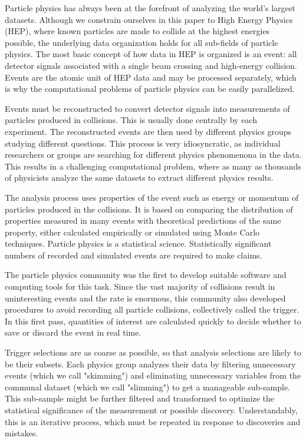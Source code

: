 \documentclass[a4paper]{jpconf}
\begin{document}
Particle physics has always been at the forefront of analyzing the world's largest datasets. Although we constrain ourselves in this paper to High Energy Physics (HEP), where known particles are made to collide at the highest energies possible, the underlying data organization holds for all sub-fields of particle physics. The most basic concept of how data in HEP is organized is an event: all detector signals associated with a single beam crossing and high-energy collision. Events are the atomic unit of HEP data and may be processed separately, which is why the computational problems of particle physics can be easily parallelized. 

Events must be reconstructed to convert detector signals into measurements of particles produced in collisions. This is usually done centrally by each experiment. The reconstructed events are then used by different physics groups studying different questions. This process is very idiosyncratic, as individual researchers or groups are searching for different physics phenomenona in the data. This results in a challenging computational problem, where as many as thousands of physicists analyze the same datasets to extract different physics results.

The analysis process uses properties of the event such as energy or momentum of particles produced in the collisions. It is based on comparing the distribution of properties measured in many events with theoretical predictions of the same property, either calculated empirically or simulated using Monte Carlo techniques. Particle physics is a statistical science. Statistically significant numbers of recorded and simulated events are required to make claims.

The particle physics community was the first to develop suitable software and computing tools for this task. Since the vast majority of collisions result in uninteresting events and the rate is enormous, this community also developed procedures to avoid recording all particle collisions, collectively called the trigger. In this first pass, quantities of interest are calculated quickly to decide whether to save or discard the event in real time.

Trigger selections are as coarse as possible, so that analysis selections are likely to be their subsets. Each physics group analyzes their data by filtering unnecessary events (which we call "skimming") and eliminating unnecessary variables from the communal dataset (which we call "slimming") to get a manageable sub-sample. This sub-sample might be further filtered and transformed to optimize the statistical significance of the measurement or possible discovery. Understandably, this is an iterative process, which must be repeated in response to discoveries and mistakes.
\end{document}

